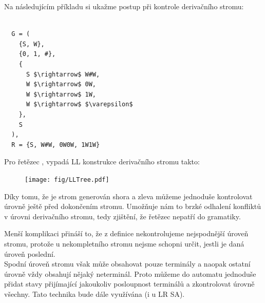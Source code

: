 \noindent
Na následujícím příkladu si ukažme postup při kontrole derivačního stromu:
\begin{exmp}
  \label{exmp:WW}
  \begin{lstlisting}

  G = (
    {S, W},
    {0, 1, #},
    {
      S $\rightarrow$ W#W,
      W $\rightarrow$ 0W,
      W $\rightarrow$ 1W,
      W $\rightarrow$ $\varepsilon$
    },
    S
  ),
  R = {S, W#W, 0W0W, 1W1W}
  \end{lstlisting}

  \noindent
  Pro řetězec , vypadá LL konstrukce derivačního stromu takto:

  \begin{figure}[H]
    \centering
    \texttt{[image: fig/LLTree.pdf]}
  \end{figure}

  Díky tomu, že je strom generován shora a zleva můžeme jednoduše
  kontrolovat úrovně ještě před dokončením stromu. Umožňuje nám to brzké
  odhalení konfliktů v úrovni derivačního stromu, tedy zjištění, že řetězec
  nepatří do gramatiky.\\

\end{exmp}

Menší komplikaci přináší to, že z definice nekontrolujeme
nejspodnější úroveň stromu, protože u nekompletního stromu nejsme schopni určit,
jestli je daná úroveň poslední.\\
Spodní úroveň stromu však může obsahovat pouze terminály a naopak
ostatní úrovně vždy obsahují nějaký neterminál. Proto můžeme do automatu
jednoduše přidat stavy přijímající jakoukoliv posloupnost terminálů a
zkontrolovat úrovně všechny. Tato technika bude dále využívána (i u LR SA).\\

